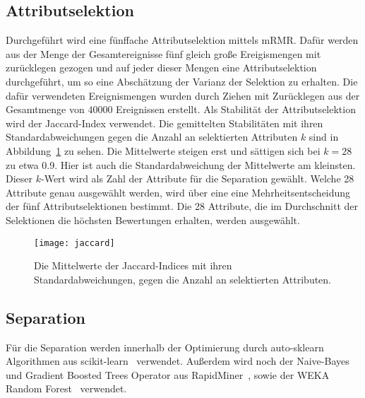 \subsection{Attributselektion}
Durchgeführt wird eine fünffache Attributselektion mittels mRMR.
Dafür werden aus der Menge der Gesamtereignisse fünf gleich große Ereigismengen mit zurücklegen gezogen und auf jeder dieser Mengen eine Attributselektion durchgeführt, um so eine Abschätzung der Varianz der Selektion zu erhalten. 
Die dafür verwendeten Ereignismengen wurden durch Ziehen mit Zurücklegen aus der Gesamtmenge von $\num{40000}$ Ereignissen erstellt.
Als Stabilität der Attributselektion wird der Jaccard-Index verwendet.
Die gemittelten Stabilitäten mit ihren Standardabweichungen gegen die Anzahl an selektierten Attributen $k$ sind in Abbildung~\ref{jaccardplot} zu sehen.
Die Mittelwerte steigen erst und sättigen sich bei $k=28$ zu etwa 0.9.
Hier ist auch die Standardabweichung der Mittelwerte am kleinsten.
Dieser $k$-Wert wird als Zahl der Attribute für die Separation gewählt.
Welche 28 Attribute genau ausgewählt werden, wird über eine eine Mehrheitsentscheidung der fünf Attributselektionen bestimmt.
Die 28 Attribute, die im Durchschnitt der Selektionen die höchsten Bewertungen erhalten, werden ausgewählt.
\begin{figure}
  \centering
  \texttt{[image: jaccard]}
\vspace{-1em}
  \caption{Die Mittelwerte der Jaccard-Indices mit ihren Standardabweichungen, gegen die Anzahl an selektierten Attributen.}
  \label{jaccardplot}
\end{figure}


\subsection{Separation}
Für die Separation werden innerhalb der Optimierung durch auto-sklearn~\cite{autosklearn} Algorithmen aus scikit-learn~\cite{scikit-learn} verwendet.
Außerdem wird noch der Naive-Bayes und Gradient Boosted Trees Operator aus RapidMiner~\cite{RapidMiner}, sowie der WEKA Random Forest~\cite{Weka2009} verwendet.


